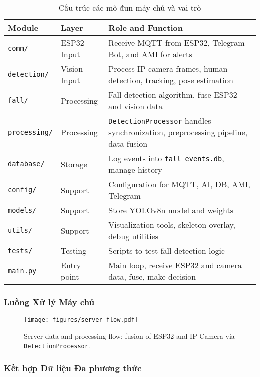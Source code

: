 \begin{table}[H]
\centering
\caption{Cấu trúc các mô-đun máy chủ và vai trò}
\label{tab:server_modules}
\begin{tabular}{|l|l|p{7cm}|}
\hline
\textbf{Module} & \textbf{Layer} & \textbf{Role and Function} \\
\hline
\texttt{comm/} & ESP32 Input & Receive MQTT from ESP32, Telegram Bot, and AMI for alerts \\
\hline
\texttt{detection/} & Vision Input & Process IP camera frames, human detection, tracking, pose estimation \\
\hline
\texttt{fall/} & Processing & Fall detection algorithm, fuse ESP32 and vision data \\
\hline
\texttt{processing/} & Processing & \texttt{DetectionProcessor} handles synchronization, preprocessing pipeline, data fusion \\
\hline
\texttt{database/} & Storage & Log events into \texttt{fall\_events.db}, manage history \\
\hline
\texttt{config/} & Support & Configuration for MQTT, AI, DB, AMI, Telegram \\
\hline
\texttt{models/} & Support & Store YOLOv8n model and weights \\
\hline
\texttt{utils/} & Support & Visualization tools, skeleton overlay, debug utilities \\
\hline
\texttt{tests/} & Testing & Scripts to test fall detection logic \\
\hline
\texttt{main.py} & Entry point & Main loop, receive ESP32 and camera data, fuse, make decision \\
\hline
\end{tabular}
\end{table}

\subsubsection{Luồng Xử lý Máy chủ}
\label{subsubsec:server_flow}

\begin{figure}[H]
\centering
\texttt{[image: figures/server\_flow.pdf]}
\caption{Server data and processing flow: fusion of ESP32 and IP Camera via \texttt{DetectionProcessor}.}
\label{fig:server_flow}
\end{figure}

\subsubsection{Kết hợp Dữ liệu Đa phương thức}
\label{subsubsec:multi_input_fusion}

